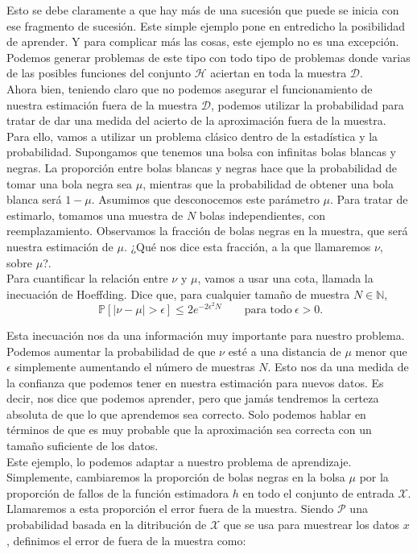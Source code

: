 Esto se debe claramente a que hay más de una sucesión que puede se inicia con ese fragmento de sucesión. Este simple ejemplo pone en entredicho la posibilidad de aprender. Y para complicar más las cosas, este ejemplo no es una excepción. Podemos generar problemas de este tipo con todo tipo de problemas donde varias de las posibles funciones del conjunto $\mathcal{H}$ aciertan en toda la muestra $\mathcal{D}$.\\

Ahora bien, teniendo claro que no podemos asegurar el funcionamiento de nuestra estimación fuera de la muestra $\mathcal{D}$, podemos utilizar la probabilidad para tratar de dar una medida del acierto de la aproximación fuera de la muestra.\\

Para ello, vamos a utilizar un problema clásico dentro de la estadística y la probabilidad. Supongamos que tenemos una bolsa con infinitas bolas blancas y negras. La proporción entre bolas blancas y negras hace que la probabilidad de tomar una bola negra sea $\mu$, mientras que la probabilidad de obtener una bola blanca será $1-\mu$. Asumimos que desconocemos este parámetro $\mu$. Para tratar de estimarlo, tomamos una muestra de $N$ bolas independientes, con reemplazamiento. Observamos la fracción de bolas negras en la muestra, que será nuestra estimación de $\mu$. ¿Qué nos dice esta fracción, a la que llamaremos $\nu$, sobre $\mu$?.\\

Para cuantificar la relación entre $\nu$ y $\mu$, vamos a usar una cota, llamada la inecuación de Hoeffding. Dice que, para cualquier tamaño de muestra $N \in \mathbb{N}$,
\[
\ \mathbb{P}\left[ \mid \nu - \mu \mid > \epsilon \right] \leq 2e^{-2\epsilon^2 N} \qquad \textrm{para todo} \  \epsilon > 0.
\]

Esta inecuación nos da una información muy importante para nuestro problema. Podemos aumentar la probabilidad de que $\nu$ esté a una distancia de $\mu$ menor que $\epsilon$ simplemente aumentando el número de muestras $N$. Esto nos da una medida de la confianza que podemos tener en nuestra estimación para nuevos datos. Es decir, nos dice que podemos aprender, pero que jamás tendremos la certeza absoluta de que lo que aprendemos sea correcto. Solo podemos hablar en términos de que es muy probable que la aproximación sea correcta con un tamaño suficiente de los datos.\\

Este ejemplo, lo podemos adaptar a nuestro problema de aprendizaje. Simplemente, cambiaremos la proporción de bolas negras en la bolsa $\mu$ por la proporción de fallos de la función estimadora $h$ en todo el conjunto de entrada $\mathcal{X}$. Llamaremos a esta proporción el error fuera de la muestra. Siendo $\mathcal{P}$ una probabilidad basada en la ditribución de $\mathcal{X}$ que se usa para muestrear los datos $x$, definimos el error de fuera de la muestra como:

